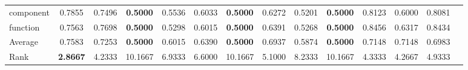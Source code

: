 \begin{threeparttable}
\begin{tabular}{lccccccccccccc}
component &0.7855 &0.7496 &\textbf{0.5000} &0.5536 &0.6033 &\textbf{0.5000} &0.6272 &0.5201 &\textbf{0.5000} &0.8123 &0.6000 &0.8081 &  \\
function &0.7563 &0.7698 &\textbf{0.5000} &0.5298 &0.6015 &\textbf{0.5000} &0.6391 &0.5268 &\textbf{0.5000} &0.8456 &0.6317 &0.8434 &  \\
\hline
Average &0.7583 &0.7253 &\textbf{0.5000} &0.6015 &0.6390 &\textbf{0.5000} &0.6937 &0.5874 &\textbf{0.5000} &0.7148 &0.7148 &0.6983 &  \\
Rank &\textbf{2.8667} &4.2333 &10.1667 &6.9333 &6.6000 &10.1667 &5.1000 &8.2333 &10.1667 &4.3333 &4.2667 &4.9333 &  \\
\bottomrule
\end{tabular}
\end{threeparttable}